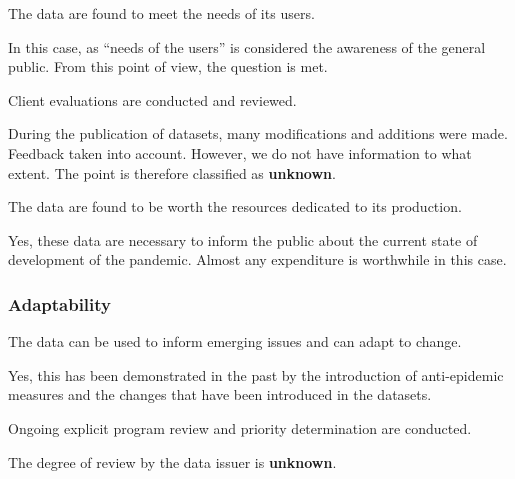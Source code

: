 \begin{QandA}
    \item The data are found to meet the needs of its users.
    \begin{answered}
        In this case, as \enquote{needs of the users} is considered the awareness of the general public.
        From this point of view, the question is met.
    \end{answered}

    \item Client evaluations are conducted and reviewed.
    \begin{answered}
        During the publication of datasets, many modifications and additions were made.
        Feedback taken into account.
        However, we do not have information to what extent.
        The point is therefore classified as \textbf{unknown}.
    \end{answered}

    \item The data are found to be worth the resources dedicated to its production.
    \begin{answered}
        Yes, these data are necessary to inform the public about the current state of development of the pandemic.
        Almost any expenditure is worthwhile in this case.
    \end{answered}

\end{QandA}

\subsubsection{Adaptability}

\begin{QandA}
    \item The data can be used to inform emerging issues and can adapt to change.
    \begin{answered}
        Yes, this has been demonstrated in the past by the introduction of anti-epidemic measures and the changes that have been introduced in the datasets.
    \end{answered}

    \item Ongoing explicit program review and priority determination are conducted.
    \begin{answered}
        The degree of review by the data issuer is \textbf{unknown}.
    \end{answered}

\end{QandA}


